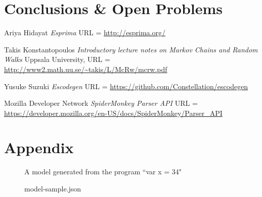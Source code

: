 \documentclass{article}
\begin{document}
\section{Conclusions \& Open Problems}

\clearpage
\begin{thebibliography}{1}

	 Ariya Hidayat {\em Esprima}
		URL = \url{http://esprima.org/}

	 Takis Konstantopoulos {\em Introductory lecture notes on
		Markov Chains and Random Walks} Uppsala University,
		URL = \url{http://www2.math.uu.se/~takis/L/McRw/mcrw.pdf}

	 Yusuke Suzuki {\em Escodegen}
		URL = \url{https://github.com/Constellation/escodegen}

	 Mozilla Developer Network {\em SpiderMonkey Parser API}
		URL = \url{https://developer.mozilla.org/en-US/docs/SpiderMonkey/Parser_API}

\end{thebibliography}

\clearpage
\section*{Appendix}

\begin{figure}[h!]
	\caption{model-sample.json}
	\centering
	A model generated from the program ``var x = 34"
\end{figure}


\end{document}
